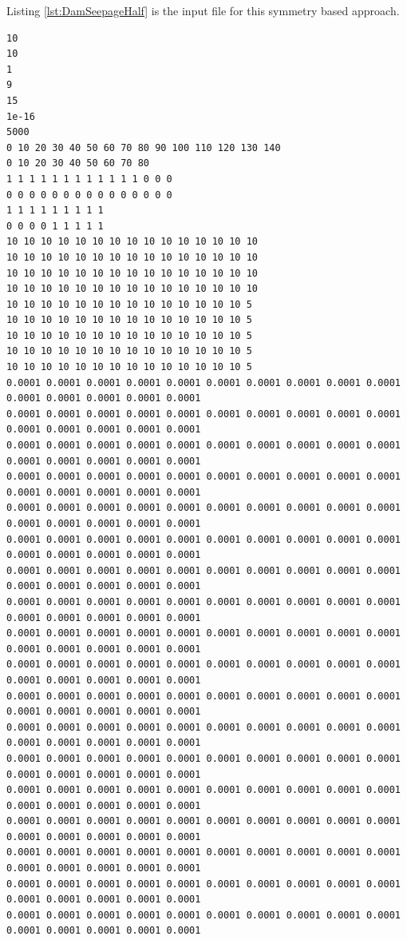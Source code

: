 Listing \ref{lst:DamSeepageHalf} is the input file for this symmetry based approach.

\begin{lstlisting}[caption= Input file for 2D vertical slice for Dam Seepage Example using Symmetry , label=lst:DamSeepageHalf]
10
10
1
9
15
1e-16
5000
0 10 20 30 40 50 60 70 80 90 100 110 120 130 140
0 10 20 30 40 50 60 70 80
1 1 1 1 1 1 1 1 1 1 1 1 0 0 0  
0 0 0 0 0 0 0 0 0 0 0 0 0 0 0  
1 1 1 1 1 1 1 1 1 
0 0 0 0 1 1 1 1 1 
10 10 10 10 10 10 10 10 10 10 10 10 10 10 10
10 10 10 10 10 10 10 10 10 10 10 10 10 10 10
10 10 10 10 10 10 10 10 10 10 10 10 10 10 10
10 10 10 10 10 10 10 10 10 10 10 10 10 10 10
10 10 10 10 10 10 10 10 10 10 10 10 10 10 5
10 10 10 10 10 10 10 10 10 10 10 10 10 10 5
10 10 10 10 10 10 10 10 10 10 10 10 10 10 5
10 10 10 10 10 10 10 10 10 10 10 10 10 10 5
10 10 10 10 10 10 10 10 10 10 10 10 10 10 5
0.0001 0.0001 0.0001 0.0001 0.0001 0.0001 0.0001 0.0001 0.0001 0.0001 0.0001 0.0001 0.0001 0.0001 0.0001
0.0001 0.0001 0.0001 0.0001 0.0001 0.0001 0.0001 0.0001 0.0001 0.0001 0.0001 0.0001 0.0001 0.0001 0.0001
0.0001 0.0001 0.0001 0.0001 0.0001 0.0001 0.0001 0.0001 0.0001 0.0001 0.0001 0.0001 0.0001 0.0001 0.0001
0.0001 0.0001 0.0001 0.0001 0.0001 0.0001 0.0001 0.0001 0.0001 0.0001 0.0001 0.0001 0.0001 0.0001 0.0001
0.0001 0.0001 0.0001 0.0001 0.0001 0.0001 0.0001 0.0001 0.0001 0.0001 0.0001 0.0001 0.0001 0.0001 0.0001
0.0001 0.0001 0.0001 0.0001 0.0001 0.0001 0.0001 0.0001 0.0001 0.0001 0.0001 0.0001 0.0001 0.0001 0.0001
0.0001 0.0001 0.0001 0.0001 0.0001 0.0001 0.0001 0.0001 0.0001 0.0001 0.0001 0.0001 0.0001 0.0001 0.0001
0.0001 0.0001 0.0001 0.0001 0.0001 0.0001 0.0001 0.0001 0.0001 0.0001 0.0001 0.0001 0.0001 0.0001 0.0001
0.0001 0.0001 0.0001 0.0001 0.0001 0.0001 0.0001 0.0001 0.0001 0.0001 0.0001 0.0001 0.0001 0.0001 0.0001
0.0001 0.0001 0.0001 0.0001 0.0001 0.0001 0.0001 0.0001 0.0001 0.0001 0.0001 0.0001 0.0001 0.0001 0.0001
0.0001 0.0001 0.0001 0.0001 0.0001 0.0001 0.0001 0.0001 0.0001 0.0001 0.0001 0.0001 0.0001 0.0001 0.0001
0.0001 0.0001 0.0001 0.0001 0.0001 0.0001 0.0001 0.0001 0.0001 0.0001 0.0001 0.0001 0.0001 0.0001 0.0001
0.0001 0.0001 0.0001 0.0001 0.0001 0.0001 0.0001 0.0001 0.0001 0.0001 0.0001 0.0001 0.0001 0.0001 0.0001
0.0001 0.0001 0.0001 0.0001 0.0001 0.0001 0.0001 0.0001 0.0001 0.0001 0.0001 0.0001 0.0001 0.0001 0.0001
0.0001 0.0001 0.0001 0.0001 0.0001 0.0001 0.0001 0.0001 0.0001 0.0001 0.0001 0.0001 0.0001 0.0001 0.0001
0.0001 0.0001 0.0001 0.0001 0.0001 0.0001 0.0001 0.0001 0.0001 0.0001 0.0001 0.0001 0.0001 0.0001 0.0001
0.0001 0.0001 0.0001 0.0001 0.0001 0.0001 0.0001 0.0001 0.0001 0.0001 0.0001 0.0001 0.0001 0.0001 0.0001
0.0001 0.0001 0.0001 0.0001 0.0001 0.0001 0.0001 0.0001 0.0001 0.0001 0.0001 0.0001 0.0001 0.0001 0.0001
\end{lstlisting}

